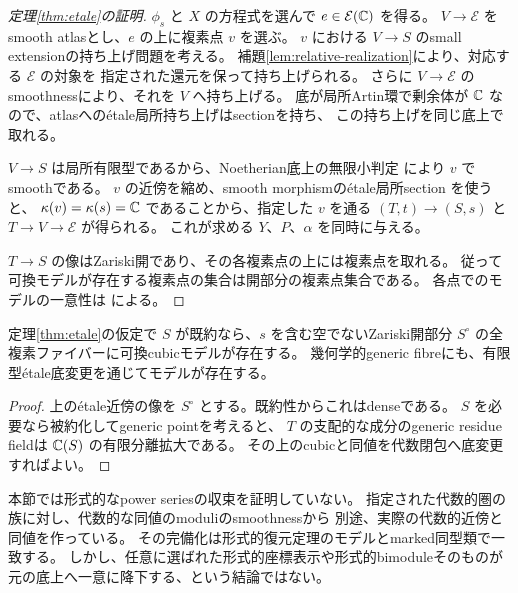 \begin{proof}[定理\ref{thm:etale}の証明]
 \(\phi_s\) と \(X\) の方程式を選んで \(e\in\mathcal E(\mathbb C)\) を得る。
 \(V\to\mathcal E\) をsmooth atlasとし、\(e\) の上に複素点 \(v\) を選ぶ。
 \(v\) における \(V\to S\) のsmall extensionの持ち上げ問題を考える。
 補題\ref{lem:relative-realization}により、対応する \(\mathcal E\) の対象を
 指定された還元を保って持ち上げられる。
 さらに \(V\to\mathcal E\) のsmoothnessにより、それを \(V\) へ持ち上げる。
 底が局所Artin環で剰余体が \(\mathbb C\) なので、atlasへのétale局所持ち上げはsectionを持ち、
 この持ち上げを同じ底上で取れる。

 \(V\to S\) は局所有限型であるから、Noetherian底上の無限小判定
 \cite[Tag 02HX]{Stacks}により \(v\) でsmoothである。
 \(v\) の近傍を縮め、smooth morphismのétale局所section
 \cite[Tag 055Uとその証明中のLemma 37.38.5]{Stacks}を使うと、
 \(\kappa(v)=\kappa(s)=\mathbb C\) であることから、指定した \(v\) を通る
 \((T,t)\to(S,s)\) と \(T\to V\to\mathcal E\) が得られる。
 これが求める \(Y\)、\(P\)、\(\alpha\) を同時に与える。

 \(T\to S\) の像はZariski開であり、その各複素点の上には複素点を取れる。
 従って可換モデルが存在する複素点の集合は開部分の複素点集合である。
 各点でのモデルの一意性は \cite[Theorem 1.7]{LZ} による。
\end{proof}

\begin{corollary}\label{cor:generic-realization}
 定理\ref{thm:etale}の仮定で \(S\) が既約なら、\(s\) を含む空でないZariski開部分
 \(S^\circ\) の全複素ファイバーに可換cubicモデルが存在する。
 幾何学的generic fibreにも、有限型étale底変更を通じてモデルが存在する。
\end{corollary}
\begin{proof}
 上のétale近傍の像を \(S^\circ\) とする。既約性からこれはdenseである。
 \(S\) を必要なら被約化してgeneric pointを考えると、
 \(T\) の支配的な成分のgeneric residue fieldは \(\mathbb C(S)\) の有限分離拡大である。
 その上のcubicと同値を代数閉包へ底変更すればよい。
\end{proof}

\begin{remark}\label{rem:algebraization-boundary}
 本節では形式的なpower seriesの収束を証明していない。
 指定された代数的圏の族に対し、代数的な同値のmoduliのsmoothnessから
 別途、実際の代数的近傍と同値を作っている。
 その完備化は形式的復元定理のモデルとmarked同型類で一致する。
 しかし、任意に選ばれた形式的座標表示や形式的bimoduleそのものが
 元の底上へ一意に降下する、という結論ではない。
\end{remark}


